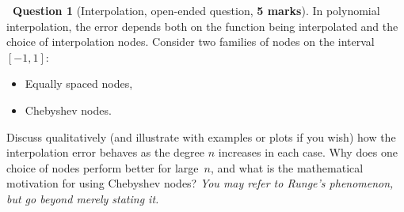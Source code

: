 \documentclass[10pt]{article}
\theoremstyle{definition}
\newtheorem{question}{{\normalfont \faGears}~Question}
\theoremstyle{remark}
\renewcommand{\mymarks}[1]{\textbf{#1 marks}}
\begin{document}
\begin{question}
    [Interpolation, open-ended question, \mymarks{5}]
    In polynomial interpolation, the error depends both on the function being interpolated and the choice of interpolation nodes. Consider two families of nodes on the interval $[-1,1]$:
    \begin{itemize}
        \item Equally spaced nodes,
        \item Chebyshev nodes.
    \end{itemize}
    Discuss qualitatively (and illustrate with examples or plots if you wish) how the interpolation error behaves as the degree
    $n$ increases in each case.
    Why does one choice of nodes perform better for large~$n$,
    and what is the mathematical motivation for using Chebyshev nodes?
    \emph{You may refer to Runge's phenomenon, but go beyond merely stating it.}
\end{question}
\end{document}

